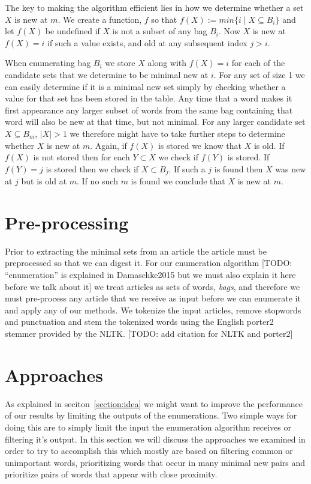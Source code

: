 The key to making the algorithm efficient lies in how we determine whether a set $X$ is new at $m$. We create a function, $f$ so that $f(X) := min\{i \mid X \subseteq B_{i}\}$ and let $f(X)$ be undefined if $X$ is not a subset of any bag $B_{i}$. Now $X$ is new at $f(X)=i$ if such a value exists, and old at any subsequent index $j>i$. 

When enumerating bag $B_{i}$ we store $X$ along with $f(X)=i$ for each of the candidate sets that we determine to be minimal new at $i$. For any set of size 1 we can easily determine if it is a minimal new set simply by checking whether a value for that set has been stored in the table.  Any time that a word makes it first appearance any larger subset of words from the same bag containing that word will also be new at that time, but not minimal. For any larger candidate set $X \subseteq B_{m}$, $|X|>1$ we therefore might have to take further steps to determine whether $X$ is new at $m$. Again, if $f(X)$ is stored we know that $X$ is old. If $f(X)$ is not stored then for each $Y \subset X$ we check if $f(Y)$ is stored. If $f(Y)=j$ is stored then we check if $X \subset B_{j}$. If such a $j$ is found then $X$ was new at $j$ but is old at $m$. If no such $m$ is found we conclude that $X$ is new at $m$.


\section{Pre-processing}
Prior to extracting the minimal sets from an article the article must be preprocessed so that we can digest it. For our enumeration algorithm [TODO: ``enumeration'' is explained in Damaschke2015 but we must also explain it here before we talk about it] we treat articles as sets of words, \emph{bags}, and therefore we must pre-process any article that we receive as input before we can enumerate it and apply any of our methods. We tokenize the input articles, remove stopwords and punctuation and stem the tokenized words using the English porter2 stemmer provided by the NLTK. [TODO: add citation for NLTK and porter2]

\section{Approaches}
As explained in seciton~\ref{section:idea} we might want to improve the performance of our results by limiting the outputs of the enumerations. Two simple ways for doing this are to simply limit the input the enumeration algorithm receives or filtering it's output.
In this section we will discuss the approaches we examined in order to try to accomplish this which mostly are based on filtering common or unimportant words, prioritizing words that occur in many minimal new pairs and prioritize pairs of words that appear with close proximity.

